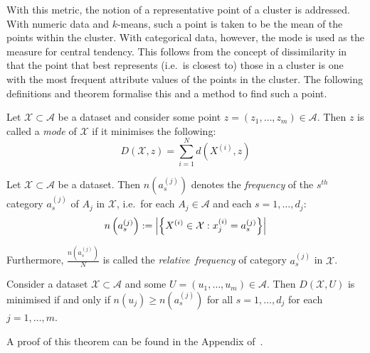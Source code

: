 With this metric, the notion of a representative point of a cluster is
addressed. With numeric data and \(k\)-means, such a point is taken to be the
mean of the points within the cluster. With categorical data, however, the mode
is used as the measure for central tendency. This follows from the concept of
dissimilarity in that the point that best represents (i.e.\ is closest to) those
in a cluster is one with the most frequent attribute values of the points in the
cluster. The following definitions and theorem formalise this and a method to
find such a point.

\begin{definition}\label{def:mode}
    Let \(\mathcal{X} \subset \mathcal{A}\) be a dataset and consider some point
    \(z = \left(z_1, \ldots, z_m\right) \in \mathcal{A}\). Then \(z\) is called
    a \emph{mode} of \(\mathcal{X}\) if it minimises the following:
    \begin{equation}\label{eq:summed-dissim}
        D\left(\mathcal{X}, z\right) = \sum_{i=1}^{N} d\left(X^{(i)}, z\right)
    \end{equation}
\end{definition}

\begin{definition}\label{def:rel-freq}
    Let \(\mathcal{X} \subset \mathcal{A}\) be a dataset. Then
    \(n\left(a_s^{(j)}\right)\) denotes the \emph{frequency} of the \(s^{th}\)
    category \(a_s^{(j)}\) of \(A_j\) in \(\mathcal{X}\), i.e.\ for each \(A_j
    \in \mathcal{A}\) and each \(s = 1, \ldots, d_j\):
    \begin{equation}
        n\left(a_s^{(j)}\right) := \abs*{%
            {\left\{X^{(i)} \in \mathcal{X}: x_j^{(i)} = a_s^{(j)}\right\}}
        }
    \end{equation}
	
    Furthermore, \(\frac{n\left(a_s^{(j)}\right)}{N}\) is called the
    \emph{relative~frequency} of category \(a_s^{(j)}\) in \(\mathcal{X}\).
\end{definition}

\begin{theorem}\label{thm:mode}
    Consider a dataset \(\mathcal{X} \subset \mathcal{A}\) and some \(U = (u_1,
    \ldots, u_m) \in \mathcal{A}\). Then \(D(\mathcal{X}, U)\) is minimised if
    and only if \(n\left(u_j\right) \geq n\left(a_s^{(j)}\right)\) for all
    \(s=1, \ldots, d_j\) for each \(j = 1, \ldots, m\).

    A proof of this theorem can be found in the Appendix of~\cite{Huang1998}.
\end{theorem}

